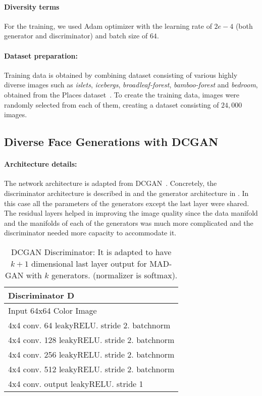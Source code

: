 \paragraph{Diversity terms} For the training, we used Adam optimizer with the learning rate of $2e-4$ (both generator and discriminator) and batch size of $64$.

\paragraph{Dataset preparation:} Training data is obtained by combining dataset consisting of various highly diverse images such as {\em islets}, {\em icebergs}, {\em broadleaf-forest}, {\em bamboo-forest} and {\em bedroom}, obtained from the Places dataset~\cite{zhou2017places}. To create the training data, images were randomly selected from each of them, creating a dataset consisting of $24,000$ images.

\subsection{Diverse Face Generations with DCGAN}
\paragraph{Architecture details:} The network architecture is adapted from DCGAN~\cite{radford2015unsupervised}. Concretely, the discriminator architecture is described in  and the generator architecture in . In this case all the parameters of the generators except the last layer were shared. The residual layers helped in improving the image quality since the data manifold and the manifolds of each of the generators was much more complicated and the discriminator needed more capacity to accommodate it.

\begin{center}
	\begin{table}
		\begin{tabular}{ | m{22em} |} 
			\hline
			\textbf{Discriminator D} \\
			\hline
			Input 64x64 Color Image \\
			\hline
			4x4 conv. 64 leakyRELU. stride 2. batchnorm \\
			\hline
			4x4 conv. 128 leakyRELU. stride 2. batchnorm \\
			\hline
			4x4 conv. 256 leakyRELU. stride 2. batchnorm \\
			\hline 
			4x4 conv. 512 leakyRELU. stride 2. batchnorm \\  
			\hline
			4x4 conv. output leakyRELU. stride 1 \\  
			\hline
		\end{tabular}
		\caption{\label{tab:dcgan-disc}DCGAN Discriminator: It is adapted to have $k+1$ dimensional last layer output for MAD-GAN with $k$ generators. (normalizer is softmax).}
	\end{table}
\end{center}

